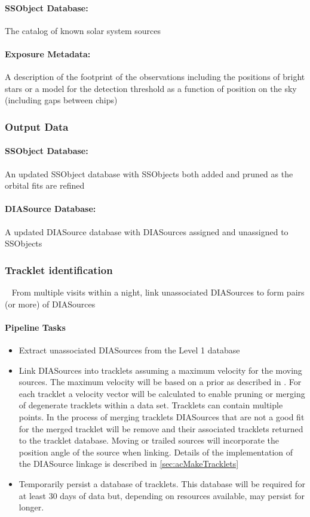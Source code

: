 \paragraph*{SSObject Database: } The catalog of known solar system sources

\paragraph*{Exposure Metadata:} A description of the footprint of the observations including the positions of bright stars or a model for the detection threshold as a function of position on the sky (including gaps between chips)


\subsubsection{Output Data}

\paragraph*{SSObject Database: } An updated SSObject database with SSObjects both added and pruned as the orbital fits are refined

\paragraph*{DIASource Database:} A updated DIASource database with DIASources assigned and unassigned to SSObjects


\subsubsection{Tracklet identification}~
From multiple visits within a night, link unassociated DIASources to form pairs (or more) of DIASources

\paragraph{Pipeline Tasks}

\begin{itemize}
\item Extract unassociated DIASources from the Level 1 database
\item Link DIASources into tracklets assuming a maximum velocity for the moving sources. The maximum velocity will be based on a prior as described in  \cite{kubica05}. For each tracklet a velocity vector will be calculated to enable pruning or merging of degenerate tracklets within a data set. Tracklets can contain multiple points. In the process of merging tracklets DIASources that are not a good fit for the merged tracklet will be remove and their associated tracklets returned to the tracklet database.  Moving or trailed sources will incorporate the position angle of the source when linking. Details of the implementation of the DIASource linkage is described in \ref{sec:acMakeTracklets}
\item Temporarily persist a database of tracklets. This database will be required for at least 30 days of data but, depending on resources available, may persist for longer.
\end{itemize}


